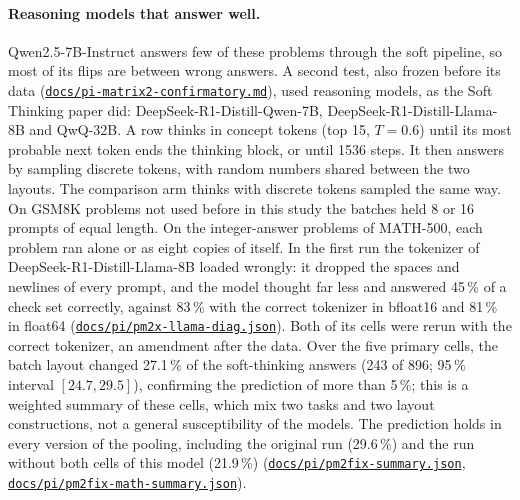 \documentclass[11pt,letterpaper]{article}
\newcommand{\repourl}{https://github.com/tdj28/neural-shrimp}
\newcommand{\reporef}{arxiv-v1}
\newcommand{\repo}[1]{\href{\repourl/blob/\reporef/#1}{\nolinkurl{#1}}}
\begin{document}
\paragraph{Reasoning models that answer well.} Qwen2.5-7B-Instruct answers few of these problems through the soft
pipeline, so most of its flips are between wrong answers. A second test, also frozen before its data
(\repo{docs/pi-matrix2-confirmatory.md}), used reasoning models, as the Soft Thinking paper did:
DeepSeek-R1-Distill-Qwen-7B, DeepSeek-R1-Distill-Llama-8B and QwQ-32B. A row thinks in concept tokens (top 15,
$T=0.6$) until its most probable next token ends the thinking block, or until 1536 steps. It then answers by sampling
discrete tokens, with random numbers shared between the two layouts. The comparison arm thinks with discrete tokens
sampled the same way. On GSM8K problems not used before in this study the batches held 8 or 16 prompts of equal length. On the integer-answer
problems of MATH-500, each problem ran alone or as eight copies of itself. In the first run the tokenizer of
DeepSeek-R1-Distill-Llama-8B loaded wrongly: it dropped the spaces and newlines of every prompt, and the model thought
far less and answered 45\,\% of a check set correctly, against 83\,\% with the correct tokenizer in bfloat16 and
81\,\% in float64 (\repo{docs/pi/pm2x-llama-diag.json}). Both of its cells were rerun with the correct tokenizer,
an amendment after the data. Over the five primary cells, the batch layout changed 27.1\,\% of the soft-thinking
answers (243 of 896; 95\,\% interval $[24.7,29.5]$), confirming the prediction of more than 5\,\%; this is a weighted
summary of these cells, which mix two tasks and two layout constructions, not a general susceptibility of the models. The prediction
holds in every version of the pooling, including the original run (29.6\,\%) and the run without both cells of this
model (21.9\,\%) (\repo{docs/pi/pm2fix-summary.json}, \repo{docs/pi/pm2fix-math-summary.json}).
\end{document}
